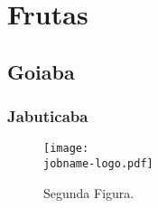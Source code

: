 \section{Frutas}
\label{sec:frutas}
\lipsum[4]

\subsection{Goiaba}
\label{sec:goiaba}
\lipsum[4]

\subsubsection{Jabuticaba}
\label{sec:jabuticaba}
\lipsum[4]

\label{sec:tomate}

\begin{figure}[tb]
  \centering
  \caption{Segunda Figura.}
  \label{fig:segunda-fig}
  \texttt{[image: \\jobname-logo.pdf]}
\end{figure}

 \lipsum[4]


